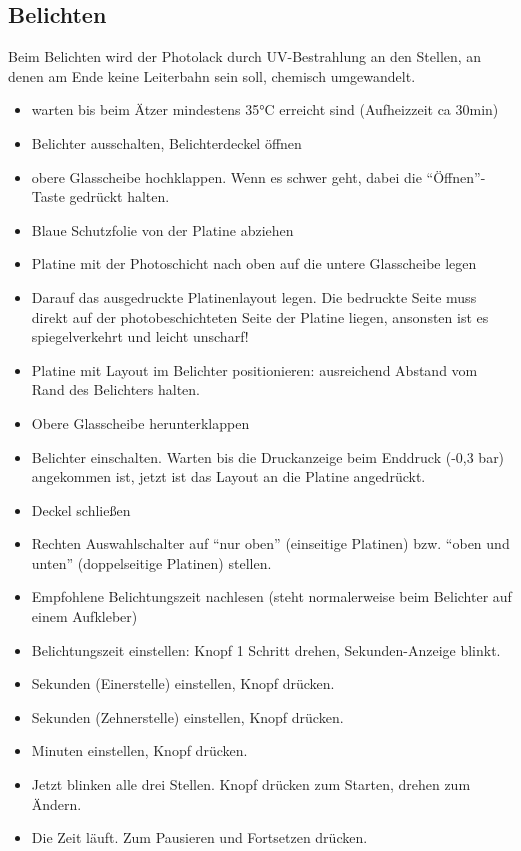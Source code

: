 \documentclass{\basedir/fablab-document}
\begin{document}
\subsection{Belichten}
\label{sec:belichten}
Beim Belichten wird der Photolack durch UV-Bestrahlung an den Stellen, an denen am Ende keine Leiterbahn sein soll, chemisch umgewandelt.

\begin{itemize}
\item warten bis beim Ätzer mindestens 35°C erreicht sind (Aufheizzeit ca 30min)
\item Belichter ausschalten, Belichterdeckel öffnen
\item obere Glasscheibe hochklappen. Wenn es schwer geht, dabei die \enquote{Öffnen}-Taste gedrückt halten.
\item Blaue Schutzfolie von der Platine abziehen
\item Platine mit der Photoschicht nach oben auf die untere Glasscheibe legen
\item Darauf das ausgedruckte Platinenlayout legen. Die bedruckte Seite muss direkt auf der photobeschichteten Seite der Platine liegen, ansonsten ist es spiegelverkehrt und leicht unscharf!
\item Platine mit Layout im Belichter positionieren: ausreichend Abstand vom Rand des Belichters halten.
\item Obere Glasscheibe herunterklappen
\item Belichter einschalten. Warten bis die Druckanzeige beim Enddruck (-0,3 bar) angekommen ist, jetzt ist das Layout an die Platine angedrückt.
\item Deckel schließen
\item Rechten Auswahlschalter auf \enquote{nur oben} (einseitige Platinen) bzw. \enquote{oben und unten} (doppelseitige Platinen) stellen. 
\item Empfohlene Belichtungszeit nachlesen (steht normalerweise beim Belichter auf einem Aufkleber)
\item Belichtungszeit einstellen: Knopf 1 Schritt drehen, Sekunden-Anzeige blinkt.
\item Sekunden (Einerstelle) einstellen, Knopf drücken.
\item Sekunden (Zehnerstelle) einstellen, Knopf drücken.
\item Minuten einstellen, Knopf drücken.
\item Jetzt blinken alle drei Stellen. Knopf drücken zum Starten, drehen zum Ändern.
\item Die Zeit läuft. Zum Pausieren und Fortsetzen drücken.
\end{itemize}
\end{document}
